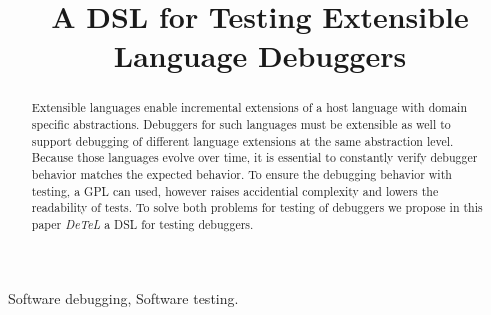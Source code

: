 \documentclass[conference]{template/IEEEtran} %
\begin{document}
\title{A DSL for Testing Extensible Language Debuggers}

\author{
\and
{}
\and
{}
\and
{}
}

\maketitle

\begin{abstract}
Extensible languages enable incremental extensions of a host
language with domain specific abstractions. Debuggers for such languages must be
extensible as well to support debugging of different language extensions at the
same abstraction level. Because those languages evolve over time, it
is essential to constantly verify debugger behavior matches the
expected behavior. To ensure the debugging behavior with testing, a \ac{GPL} can
used, however raises accidential complexity and lowers the readability of tests. 
To solve both problems for testing of debuggers we propose in this paper
\emph{DeTeL} a \ac{DSL} for testing debuggers. 
\end{abstract}

\begin{IEEEkeywords}
Software debugging, Software testing.
\end{IEEEkeywords}













\end{document}

